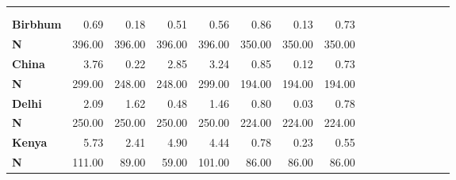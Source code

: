 \begin{tabular}{@{\extracolsep{5pt}}lrrrrrrrrrrrrrrr}
\toprule
&  &  &  &  &  &  &  \\
{\bf } &  &  &  &  &  &  &  \\
\hline
{\bf Birbhum} & 0.69\phantom{***} & 0.18\phantom{***} & 0.51\phantom{***} & 0.56\phantom{***} & 0.86\phantom{***} & 0.13\phantom{***} & 0.73\phantom{***} \\
{\bf N} & 396.00\phantom{***} & 396.00\phantom{***} & 396.00\phantom{***} & 396.00\phantom{***} & 350.00\phantom{***} & 350.00\phantom{***} & 350.00\phantom{***} \\
{\bf China} & 3.76\phantom{***} & 0.22\phantom{***} & 2.85\phantom{***} & 3.24\phantom{***} & 0.85\phantom{***} & 0.12\phantom{***} & 0.73\phantom{***} \\
{\bf N} & 299.00\phantom{***} & 248.00\phantom{***} & 248.00\phantom{***} & 299.00\phantom{***} & 194.00\phantom{***} & 194.00\phantom{***} & 194.00\phantom{***} \\
{\bf Delhi} & 2.09\phantom{***} & 1.62\phantom{***} & 0.48\phantom{***} & 1.46\phantom{***} & 0.80\phantom{***} & 0.03\phantom{***} & 0.78\phantom{***} \\
{\bf N} & 250.00\phantom{***} & 250.00\phantom{***} & 250.00\phantom{***} & 250.00\phantom{***} & 224.00\phantom{***} & 224.00\phantom{***} & 224.00\phantom{***} \\
{\bf Kenya} & 5.73\phantom{***} & 2.41\phantom{***} & 4.90\phantom{***} & 4.44\phantom{***} & 0.78\phantom{***} & 0.23\phantom{***} & 0.55\phantom{***} \\
{\bf N} & 111.00\phantom{***} & 89.00\phantom{***} & 59.00\phantom{***} & 101.00\phantom{***} & 86.00\phantom{***} & 86.00\phantom{***} & 86.00\phantom{***} \\

\end{tabular}
